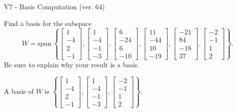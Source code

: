 \begin{exercise}
  \begin{exerciseTitle}V7 - Basis Computation (ver. 64)\end{exerciseTitle}
  \begin{exerciseStatement}
    Find a basis for the subspace 
\[W=\mathrm{span}\ \left\{\left[\begin{array}{r}
1 \\
-4 \\
2 \\
-1
\end{array}\right] , \left[\begin{array}{r}
1 \\
-4 \\
-1 \\
-3
\end{array}\right] , \left[\begin{array}{r}
6 \\
-24 \\
6 \\
-10
\end{array}\right] , \left[\begin{array}{r}
11 \\
-44 \\
10 \\
-19
\end{array}\right] , \left[\begin{array}{r}
-21 \\
84 \\
-18 \\
37
\end{array}\right] , \left[\begin{array}{r}
-2 \\
-1 \\
1 \\
2
\end{array}\right]\right\}.\]
 Be sure to explain why your result is a basis.


  \end{exerciseStatement}
  \begin{exerciseAnswer}
   A basis of \(W\) is  \(\left\{\left[\begin{array}{r}
1 \\
-4 \\
2 \\
-1
\end{array}\right] , \left[\begin{array}{r}
1 \\
-4 \\
-1 \\
-3
\end{array}\right] , \left[\begin{array}{r}
-2 \\
-1 \\
1 \\
2
\end{array}\right]\right\}\).
  


  \end{exerciseAnswer}
\end{exercise}